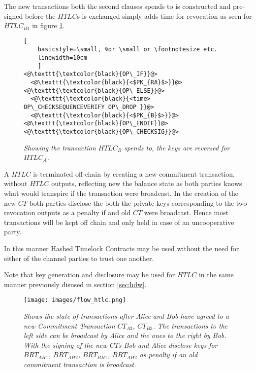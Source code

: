 The new transactions both the second clauses spends to is constructed and pre-signed before the $HTLC$s is exchanged simply adds time for revocation as seen for $HTLC_{B1}$ in figure \ref{fig:timeout:tx}.

\begin{figure}[hbt!]
	
	\centering
	
	\begin{lstlisting}[
	basicstyle=\small, %or \small or \footnotesize etc.
	linewidth=10cm
	]
<@\texttt{\textcolor{black}{OP\_IF}}@>
  <@\texttt{\textcolor{black}{<$PK_{RA}$>}}@>
<@\texttt{\textcolor{black}{OP\_ELSE}}@>
  <@\texttt{\textcolor{black}{<time> OP\_CHECKSEQUENCEVERIFY OP\_DROP }}@>
  <@\texttt{\textcolor{black}{<$PK_{B}$>}}@>
<@\texttt{\textcolor{black}{OP\_ENDIF}}@>
<@\texttt{\textcolor{black}{OP\_CHECKSIG}}@>
	\end{lstlisting}
	
	\caption{\textit{ Showing the transaction $HTLC_{B}$ spends to, the keys are reversed for $HTLC_{A}$.
	}}
	\label{fig:timeout:tx}
\end{figure}

A $HTLC$ is terminated off-chain by creating a new commitment transaction, without $HTLC$ outputs, reflecting new the balance state as both parties knows what would transpire if the transaction were broadcast. In the creation of the new $CT$ both parties disclose the both the private keys corresponding to the two revocation outputs as a penalty if and old $CT$ were broadcast. Hence most transactions will be kept off chain and only held in case of an uncooperative party.

In this manner Hashed Timelock Contracts may be used without the need for either of the channel parties to trust one another.

Note that key generation and disclosure may be used for $HTLC$ in the same manner previously disused in section \ref{sec:hdw}.

\newpage
\onecolumn

\begin{figure}[!htb]

	\centering
	\texttt{[image: images/flow\_htlc.png]}

	\caption{\textit{
			Shows the state of transactions after Alice and Bob have agreed to a new Commitment Transaction $CT_{A3}$, $CT_{B3}$. 
			The transactions to the left side can be broadcast by Alice and the ones to the right by Bob. With the signing of the new $CT$s
			Bob and Alice disclose keys for $BRT_{AH1}$, $BRT_{AH2}$, $BRT_{BH1}$, $BRT_{AH2}$ as penalty if an old commitment transaction is broadcast.
		}}
\end{figure}
\newpage
\twocolumn

